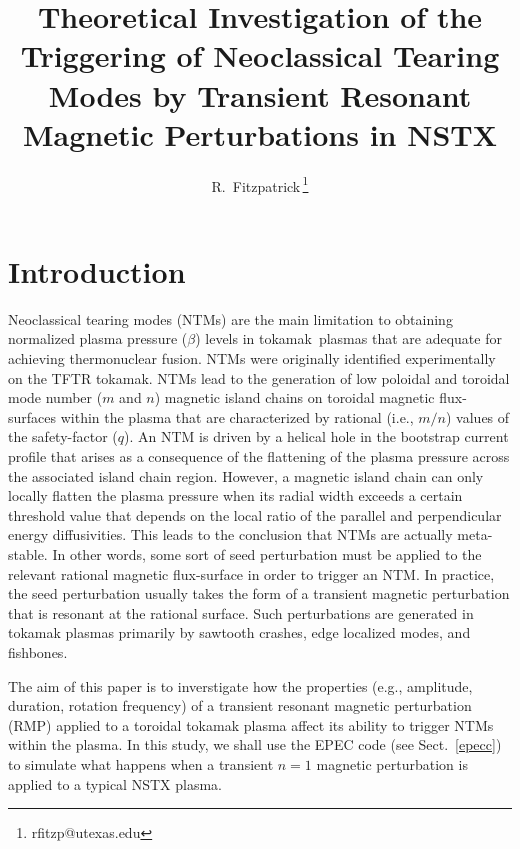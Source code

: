 \documentclass[12pt,prb,aps]{revtex4-1}
\begin{document}
\title{Theoretical Investigation of the Triggering of Neoclassical Tearing Modes by Transient Resonant Magnetic Perturbations in NSTX}
\author{R.~Fitzpatrick\,\footnote{rfitzp@utexas.edu}}

\begin{abstract}

\end{abstract}

\maketitle

\section{Introduction}
Neoclassical tearing modes (NTMs) are the main limitation to obtaining
normalized plasma pressure ($\beta$) levels in tokamak\,\cite{wesson} plasmas that are adequate for  achieving 
thermonuclear fusion.\cite{buttery,lahaye} NTMs were originally identified experimentally on the TFTR tokamak.\cite{tftr} NTMs lead to the generation of low poloidal and toroidal mode number ($m$ and $n$) magnetic island chains on toroidal magnetic flux-surfaces within the plasma that are characterized by rational (i.e., $m/n$) values of the safety-factor ($q$). An NTM is driven by a helical hole in the bootstrap current\,\cite{boot} profile  that arises as a consequence of the flattening of the
plasma pressure across the associated island chain region.\cite{carrera} However, a magnetic island chain can only locally flatten
the plasma pressure  when its radial width exceeds a certain threshold value that depends on the local ratio of the
parallel and perpendicular energy diffusivities.\cite{fitz} This  leads to the conclusion that NTMs are actually meta-stable.
In other words, some sort of seed perturbation must be applied to the relevant rational magnetic flux-surface in order to trigger an NTM. In practice, the seed perturbation usually takes the form of a transient magnetic perturbation that is resonant at the
rational surface. Such perturbations are generated in tokamak plasmas primarily by sawtooth crashes, edge localized modes, and fishbones.\cite{buttery,lahaye} 

The aim of this paper is to inverstigate how the properties (e.g., amplitude, duration, rotation frequency) of a transient resonant
magnetic perturbation (RMP) applied to a toroidal tokamak plasma affect its ability to trigger NTMs within the plasma. In this
study, we shall use the EPEC code (see Sect.~\ref{epecc}) to simulate what happens when a transient  $n=1$  magnetic
perturbation  is applied to a typical NSTX plasma. 
\end{document}
